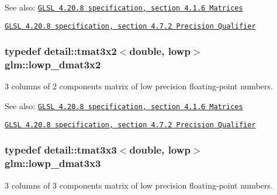\begin{Desc}
\item[See also:]\href{http://www.opengl.org/registry/doc/GLSLangSpec.4.20.8.pdf}{\tt GLSL 4.20.8 specification, section 4.1.6 Matrices} 

\href{http://www.opengl.org/registry/doc/GLSLangSpec.4.20.8.pdf}{\tt GLSL 4.20.8 specification, section 4.7.2 Precision Qualifier} \end{Desc}
\hypertarget{group__core__precision_g678c21e4fadeda255cfb146d40844bdd}{
\subsubsection[lowp\_\-dmat3x2]{\setlength{\rightskip}{0pt plus 5cm}typedef detail::tmat3x2$<$double, lowp$>$ {\bf glm::lowp\_\-dmat3x2}}}
\label{group__core__precision_g678c21e4fadeda255cfb146d40844bdd}


3 columns of 2 components matrix of low precision floating-point numbers.

\begin{Desc}
\item[See also:]\href{http://www.opengl.org/registry/doc/GLSLangSpec.4.20.8.pdf}{\tt GLSL 4.20.8 specification, section 4.1.6 Matrices} 

\href{http://www.opengl.org/registry/doc/GLSLangSpec.4.20.8.pdf}{\tt GLSL 4.20.8 specification, section 4.7.2 Precision Qualifier} \end{Desc}
\hypertarget{group__core__precision_gea1bc4ede38e1b904f01ff5ce59210ea}{
\subsubsection[lowp\_\-dmat3x3]{\setlength{\rightskip}{0pt plus 5cm}typedef detail::tmat3x3$<$double, lowp$>$ {\bf glm::lowp\_\-dmat3x3}}}
\label{group__core__precision_gea1bc4ede38e1b904f01ff5ce59210ea}


3 columns of 3 components matrix of low precision floating-point numbers.

